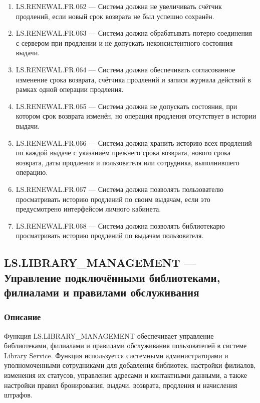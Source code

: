 \documentclass[12pt,a4paper]{article}
\begin{document}
\begin{enumerate}
		\item LS.RENEWAL.FR.062 --- Система должна не увеличивать счётчик продлений,
		если новый срок возврата не был успешно сохранён.
		
		\item LS.RENEWAL.FR.063 --- Система должна обрабатывать потерю соединения с сервером
		при продлении и не допускать неконсистентного состояния выдачи.
		
		\item LS.RENEWAL.FR.064 --- Система должна обеспечивать согласованное изменение
		срока возврата, счётчика продлений и записи журнала действий в рамках одной
		операции продления.
		
		\item LS.RENEWAL.FR.065 --- Система должна не допускать состояния, при котором
		срок возврата изменён, но операция продления отсутствует в истории выдачи.
		
		\item LS.RENEWAL.FR.066 --- Система должна хранить историю всех продлений
		по каждой выдаче с указанием прежнего срока возврата, нового срока возврата,
		даты продления и пользователя или сотрудника, выполнившего операцию.
		
		\item LS.RENEWAL.FR.067 --- Система должна позволять пользователю просматривать
		историю продлений по своим выдачам, если это предусмотрено интерфейсом личного
		кабинета.
		
		\item LS.RENEWAL.FR.068 --- Система должна позволять библиотекарю просматривать
		историю продлений по выдачам пользователя.
	\end{enumerate}
	
	\subsection{LS.LIBRARY\_MANAGEMENT --- Управление подключёнными библиотеками, филиалами и правилами обслуживания}
	
	\subsubsection{Описание}
	
	Функция LS.LIBRARY\_MANAGEMENT обеспечивает управление библиотеками,
	филиалами и правилами обслуживания пользователей в системе Library Service.
	Функция используется системными администраторами и уполномоченными
	сотрудниками для добавления библиотек, настройки филиалов, изменения их
	статусов, управления адресами и контактными данными, а также настройки правил
	бронирования, выдачи, возврата, продления и начисления штрафов.
	
\end{document}
